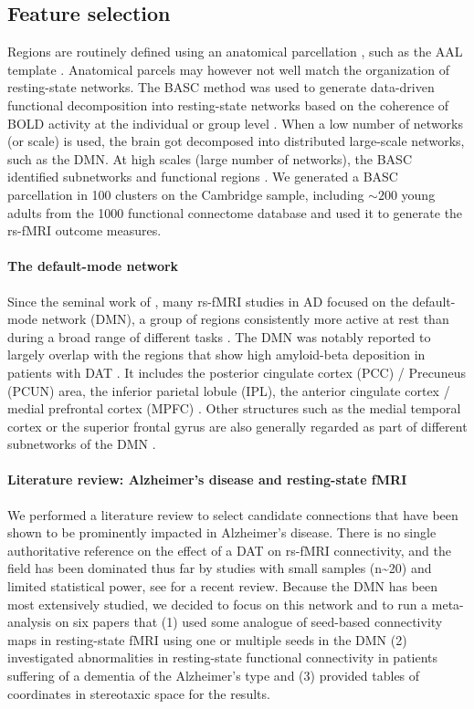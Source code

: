 \documentclass[authoryear]{elsarticle}
\begin{document}
\subsection{Feature selection}
Regions are routinely defined using an anatomical parcellation \citep{He2009}, such as the AAL template \citep{Tzourio-Mazoyer2002}. Anatomical parcels may however not well match the organization of resting-state networks. The BASC method was used to generate data-driven functional decomposition into resting-state networks based on the coherence of BOLD activity at the individual or group level \citep{Bellec2006,Bellec2010c,Bellec2013}. When a low number of networks (or scale) is used, the brain got decomposed into distributed large-scale networks, such as the DMN. At high scales (large number of networks), the BASC identified subnetworks and functional regions \citep{Kelly2012}. We generated a BASC parcellation in 100 clusters on the Cambridge sample, including $\sim 200$ young adults from the 1000 functional connectome database \citep{Biswal2010} and used it to generate the rs-fMRI outcome measures.

\paragraph{The default-mode network}
Since the seminal work of \cite{Greicius2004}, many rs-fMRI studies in AD focused on the default-mode network (DMN), a group of regions consistently more active at rest than during a broad range of different tasks \citep{Gusnard2001}. The DMN was notably reported to largely overlap with the regions that show high amyloid-beta deposition in patients with DAT \citep{Buckner2009}. It includes the posterior cingulate cortex (PCC) / Precuneus (PCUN) area, the inferior parietal lobule (IPL), the anterior cingulate cortex / medial prefrontal cortex (MPFC) \citep{Greicius2003}. Other structures such as the medial temporal cortex or the superior frontal gyrus are also generally regarded as part of different subnetworks of the DMN \citep{Margulies2009, Andrews-Hanna2010a}.

\paragraph{Literature review: Alzheimer's disease and resting-state fMRI}
We performed a literature review to select candidate connections that have been shown to be prominently impacted in Alzheimer's disease. There is no single authoritative reference on the effect of a DAT on rs-fMRI connectivity, and the field has been dominated thus far by studies with small samples (n\textasciitilde20) and limited statistical power, see \cite{Sheline2013} for a recent review. Because the DMN has been most extensively studied, we decided to focus on this network and to run a meta-analysis on six papers that (1) used some analogue of seed-based connectivity maps in resting-state fMRI using one or multiple seeds in the DMN (2) investigated abnormalities in resting-state functional connectivity in patients suffering of a dementia of the Alzheimer's type and (3) provided tables of coordinates in stereotaxic space for the results.
\end{document}
